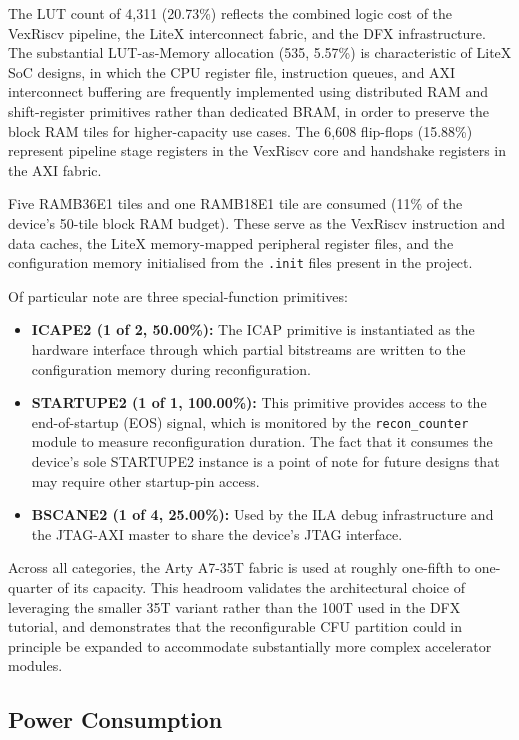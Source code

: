 The LUT count of 4,311 (20.73\%) reflects the combined logic cost of the VexRiscv pipeline, the LiteX interconnect fabric, and the DFX infrastructure. The substantial LUT-as-Memory allocation (535, 5.57\%) is characteristic of LiteX SoC designs, in which the CPU register file, instruction queues, and AXI interconnect buffering are frequently implemented using distributed RAM and shift-register primitives rather than dedicated BRAM, in order to preserve the block RAM tiles for higher-capacity use cases. The 6,608 flip-flops (15.88\%) represent pipeline stage registers in the VexRiscv core and handshake registers in the AXI fabric.

Five RAMB36E1 tiles and one RAMB18E1 tile are consumed (11\% of the device's 50-tile block RAM budget). These serve as the VexRiscv instruction and data caches, the LiteX memory-mapped peripheral register files, and the configuration memory initialised from the \texttt{.init} files present in the project.

Of particular note are three special-function primitives:

\begin{itemize}
  \item \textbf{ICAPE2 (1 of 2, 50.00\%):} The ICAP primitive is instantiated as the hardware interface through which partial bitstreams are written to the configuration memory during reconfiguration.
  \item \textbf{STARTUPE2 (1 of 1, 100.00\%):} This primitive provides access to the end-of-startup (EOS) signal, which is monitored by the \texttt{recon\_counter} module to measure reconfiguration duration. The fact that it consumes the device's sole STARTUPE2 instance is a point of note for future designs that may require other startup-pin access.
  \item \textbf{BSCANE2 (1 of 4, 25.00\%):} Used by the ILA debug infrastructure and the JTAG-AXI master to share the device's JTAG interface.
\end{itemize}
Across all categories, the Arty A7-35T fabric is used at roughly one-fifth to one-quarter of its capacity. This headroom validates the architectural choice of leveraging the smaller 35T variant rather than the 100T used in the DFX tutorial, and demonstrates that the reconfigurable CFU partition could in principle be expanded to accommodate substantially more complex accelerator modules.

\subsection{Power Consumption}

